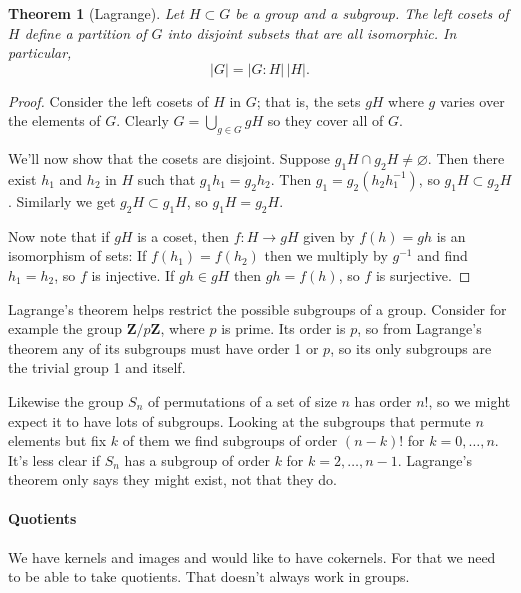 \documentclass[11pt]{article}
\newtheorem{theo}{Theorem}
\theoremstyle{definition}
\def\ZZ{\mathbf{Z}}
\begin{document}
\begin{theo}[Lagrange]
Let $H \subset G$ be a group and a subgroup.
The left cosets of $H$ define a partition of $G$ into disjoint subsets that are
all isomorphic.
In particular,
$$
|G| = |G : H| \, |H|.
$$
\end{theo}

\begin{proof}
Consider the left cosets of $H$ in $G$; that is, the sets $g H$ where $g$
varies over the elements of $G$.
Clearly $G = \bigcup_{g \in G} gH$ so they cover all of $G$.

We'll now show that the cosets are disjoint.
Suppose $g_1 H \cap g_2 H \not= \varnothing$.
Then there exist $h_1$ and $h_2$ in $H$ such that $g_1 h_1 = g_2 h_2$.
Then $g_1 = g_2 (h_2 h_1^{-1})$, so $g_1 H \subset g_2 H$.
Similarly we get $g_2 H \subset g_1 H$, so $g_1 H = g_2 H$.

Now note that if $gH$ is a coset, then $f : H \to gH$ given by $f(h) = gh$ is
an isomorphism of sets:
If $f(h_1) = f(h_2)$ then we multiply by $g^{-1}$ and find $h_1 = h_2$, so $f$ is injective.
If $gh \in gH$ then $gh = f(h)$, so $f$ is surjective.
\end{proof}


Lagrange's theorem helps restrict the possible subgroups of a group.
Consider for example the group $\ZZ / p \ZZ$, where $p$ is prime.
Its order is $p$, so from Lagrange's theorem any of its subgroups must have
order 1 or $p$, so its only subgroups are the trivial group 1 and itself.

Likewise the group $S_n$ of permutations of a set of size $n$ has order $n!$,
so we might expect it to have lots of subgroups.
Looking at the subgroups that permute $n$ elements but fix $k$ of them we find
subgroups of order $(n-k)!$ for $k = 0, \ldots, n$.
It's less clear if $S_n$ has a subgroup of order $k$ for $k = 2, \ldots, n-1$.
Lagrange's theorem only says they might exist, not that they do.



\paragraph{Quotients}

We have kernels and images and would like to have cokernels.
For that we need to be able to take quotients.
That doesn't always work in groups.
\end{document}
